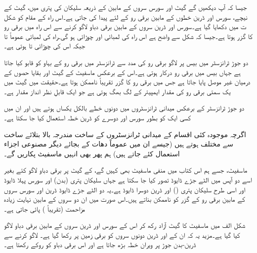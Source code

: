 جیسا کہ آپ دیکھیں گے گیٹ اور سورس سروں کے مابین   کے ذریعہ سلیکان کی پتری میں، گیٹ کے نیچے، سورس اور ڈرین خطوں کے مابین برقی رو کے لئے   پیدا کی جاتی ہے۔اس راہ کے مقام کو شکل  ت میں دکھایا گیا ہے۔سورس اور ڈرین سروں کے مابین برقی دباو لاگو کرنے سے اس راہ میں برقی رو کا گزر ہوتا ہے۔جیسا کہ شکل سے واضح ہے اس راہ کی لمبائی  اور چوڑائی  ہو گی۔راہ کی لمبائی عموماً    تا  جبکہ اس کی چوڑائی  تا  ہوتی ہے۔

دو جوڑ ٹرانزسٹر میں بیس پر لاگو برقی رو کی مدد سے ٹرانزسٹر میں برقی رو کے بہاو کو قابو کیا جاتا ہے جہاں بیس میں  برقی رو درکار ہوتی ہے۔اس کے برعکس ماسفیٹ کے گیٹ  اور بقایا حصوں کے درمیان غیر موصل  پایا جاتا ہے جس میں برقی رو کا گزر تقریباً ناممکن ہوتا ہے۔حقیقت میں گیٹ میں یک سمتی برقی رو کی مقدار  ایمپیئر کے لگ بھگ  ہوتی ہے جو ایک قابلِ نظر انداز مقدار ہے۔

دو جوڑ ٹرانزسٹر کے برعکس میدانی ٹرانزسٹروں میں دونوں  خطے بالکل یکساں ہوتے ہیں اور ان میں کسی ایک کو بطور سورس اور دوسرے کو ڈرین خطہ استعمال کیا جا سکتا ہے۔ 

اگرچہ موجودہ کئی اقسام کے میدانی ٹرانزسٹروں کے ساخت مندرجہ بالا بتلائے ساخت سے مختلف ہوتے ہیں (جیسے ان میں عموماً دھات کے بجائے دیگر مصنوعی  اجزاء استعمال کئے جاتے ہیں) ہم پھر بھی انہیں ماسفیٹ پکاریں گے۔


 ماسفیٹ، جسے ہم اس کتاب میں منفی ماسفیٹ بھی کہیں گے، کے گیٹ پر برقی دباو لاگو کئے بغیر اسے دو آپس میں الٹے جڑے ڈایوڈ تصور کیا جا سکتا ہے جہاں  سلیکان پتری (بدن) اور   سورس پہلا ڈایوڈ اور اسی طرح   سلیکان پتری () اور   ڈرین دوسرا ڈایوڈ ہے۔یہ دو الٹے جڑے ڈایوڈ ڈرین اور سورس سروں کے مابین برقی رو کے گزر کو ناممکن بناتے ہیں۔اس صورت میں ان دو سروں کے مابین نہایت زیادہ مزاحمت (تقریباً   ) پائی جاتی ہے۔

شکل  الف میں ماسفیٹ کا گیٹ آزاد رکھ کر اس کے سورس اور ڈرین سروں کے مابین برقی دباو  لاگو کیا گیا ہے۔مزید یہ کہ ان کے  اور ڈرین دونوں سروں کو برقی زمین پر رکھا گیا ہے۔   لاگو کرنے سے ڈرین-بدن جوڑ پر ویران خطہ بڑھ جاتا ہے اور اس برقی دباو کو روکے رکھتا ہے۔


